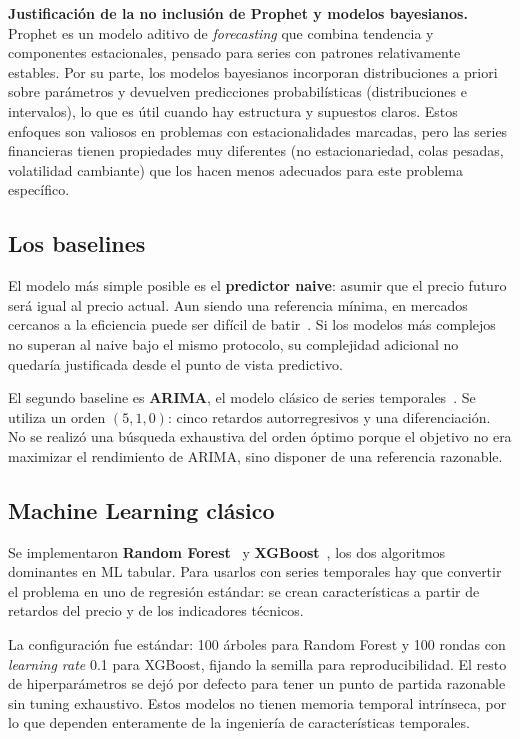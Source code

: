 \textbf{Justificación de la no inclusión de Prophet y modelos bayesianos.} Prophet es un modelo aditivo de \textit{forecasting} que combina tendencia y componentes estacionales, pensado para series con patrones relativamente estables. Por su parte, los modelos bayesianos incorporan distribuciones a priori sobre parámetros y devuelven predicciones probabilísticas (distribuciones e intervalos), lo que es útil cuando hay estructura y supuestos claros. Estos enfoques son valiosos en problemas con estacionalidades marcadas, pero las series financieras tienen propiedades muy diferentes (no estacionariedad, colas pesadas, volatilidad cambiante) que los hacen menos adecuados para este problema específico.

\subsection{Los baselines}

El modelo más simple posible es el \textbf{predictor naive}: asumir que el precio futuro será igual al precio actual. Aun siendo una referencia mínima, en mercados cercanos a la eficiencia puede ser difícil de batir~\cite{fama1970efficient}. Si los modelos más complejos no superan al naive bajo el mismo protocolo, su complejidad adicional no quedaría justificada desde el punto de vista predictivo.

El segundo baseline es \textbf{ARIMA}, el modelo clásico de series temporales~\cite{box2015time}. Se utiliza un orden $(5,1,0)$: cinco retardos autorregresivos y una diferenciación. No se realizó una búsqueda exhaustiva del orden óptimo porque el objetivo no era maximizar el rendimiento de ARIMA, sino disponer de una referencia razonable.

\subsection{Machine Learning clásico}

Se implementaron \textbf{Random Forest}~\cite{breiman2001random} y \textbf{XGBoost}~\cite{chen2016xgboost}, los dos algoritmos dominantes en ML tabular. Para usarlos con series temporales hay que convertir el problema en uno de regresión estándar: se crean características a partir de retardos del precio y de los indicadores técnicos.

La configuración fue estándar: 100 árboles para Random Forest y 100 rondas con \textit{learning rate} 0.1 para XGBoost, fijando la semilla para reproducibilidad. El resto de hiperparámetros se dejó por defecto para tener un punto de partida razonable sin tuning exhaustivo. Estos modelos no tienen memoria temporal intrínseca, por lo que dependen enteramente de la ingeniería de características temporales.

